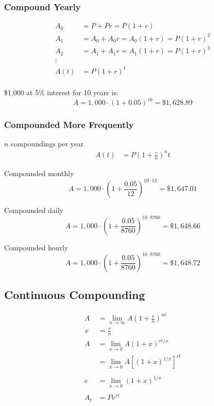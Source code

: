\documentclass[letterpaper, landscape]{exam}
\begin{document}
  \subsubsection{Compound Yearly} %
  \begin{align*}
    A_0 &= P + Pr = P(1 + r) \\
    A_1 &= A_0 + A_0 r = A_0 (1 + r) = P(1 + r)^2 \\
    A_2 &= A_1 + A_1 r = A_1 (1 + r) = P(1 + r)^3 \\
    \vdots \\
    A(t) &= P(1 + r)^t \\
  \end{align*}
  
  \$1,000 at 5\% interest for 10 years is:
  \[
    A = 1,000 \cdot (1 + 0.05)^{10} = \$1,628.89
  \]

  \subsubsection{Compounded More Frequently} %

  $n$ compoundings per year
  \begin{align*}
    A(t) &= P \left(1 + \frac{r}{n} \right)^nt
  \end{align*}
  
  Compounded monthly
  \[
    A = 1,000 \cdot \left( 1 + \frac{0.05}{12} \right)^{10 \cdot 12} = \$1,647.01
  \]

  Compounded daily
  \[
    A = 1,000 \cdot \left( 1 + \frac{0.05}{8760} \right)^{10 \cdot 8760} = \$1,648.66
  \]

  Compounded hourly
  \[
    A = 1,000 \cdot \left( 1 + \frac{0.05}{8760} \right)^{10 \cdot 8760} = \$1,648.72
  \]

  \subsection{Continuous Compounding} %
  
  \begin{align*}
    A   & = \lim_{n \to \infty} A \left( 1 + \frac{r}{n} \right)^{nt}
    \\
    x   & = \frac{r}{n} \
    \\
    A   & = \lim_{x \to 0} A \left( 1 + x \right)^{rt/x} \\
        & = \lim_{x \to 0} A \left[ \left( 1 + x \right)^{1/x} \right]^{rt} \\
    \\
    e   & = \lim_{x \to 0} \left( 1 + x \right)^{1/x} \\
    \\
    A_t & = P e^{rt} \\
  \end{align*}
\end{document}
